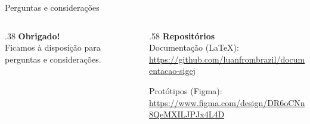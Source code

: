 \documentclass[aspectratio=169,9pt]{beamer}
\begin{document}
\begin{frame}{Perguntas e considerações}
  \begin{columns}[c]
    \begin{column}{.38\textwidth}
      \Large\textbf{\color{cefet}Obrigado!}\\[6pt]
      \normalsize Ficamos à disposição para perguntas e considerações.
    \end{column}
    \begin{column}{.58\textwidth}
      \footnotesize\textbf{Repositórios}\\[3pt]
      Documentação (\LaTeX):\\ \url{https://github.com/luanfrombrazil/documentacao-sigej}\\
      \vspace{1cm}
      
      Protótipos (Figma):\\ \url{https://www.figma.com/design/DR6oCNn8QeMXILJPJx4L4D}
    \end{column}
  \end{columns}
\end{frame}
\end{document}
